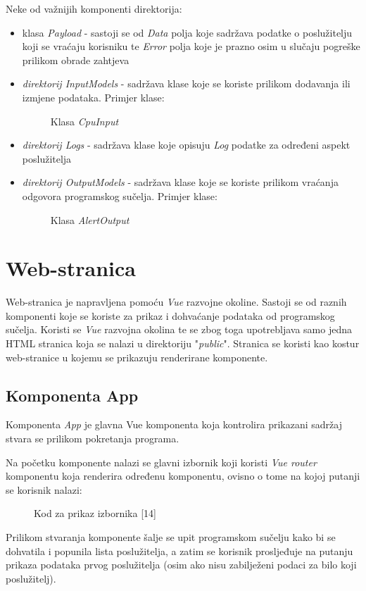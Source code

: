 \documentclass[zavrsnirad]{fer}
\begin{document}
Neke od važnijih komponenti direktorija:
\begin{itemize}
	\item klasa \textit{Payload} - sastoji se od \textit{Data} polja koje sadržava podatke o poslužitelju koji se vraćaju korisniku te \textit{Error} polja koje je prazno osim u slučaju pogreške prilikom obrade zahtjeva
	\item \textit{direktorij InputModels}  - sadržava klase koje se koriste prilikom dodavanja ili izmjene podataka. Primjer klase:
	\begin{figure}[htb]
		\centering
		
		\caption{Klasa \textit{CpuInput}}
	\end{figure}
	\FloatBarrier
	\item \textit{direktorij Logs} - sadržava klase koje opisuju \textit{Log} podatke za određeni aspekt poslužitelja
	\item \textit{direktorij OutputModels} - sadržava klase koje se koriste prilikom vraćanja odgovora programskog sučelja. Primjer klase:
	\begin{figure}[htb]
		\centering
		
		\caption{Klasa \textit{AlertOutput}}
	\end{figure}
	\FloatBarrier
\end{itemize}

\chapter{Web-stranica}
Web-stranica je napravljena pomoću \textit{Vue} razvojne okoline. Sastoji se od raznih komponenti koje se koriste za prikaz i dohvaćanje podataka od programskog sučelja.
Koristi se \textit{Vue} razvojna okolina te se zbog toga upotrebljava samo jedna HTML stranica koja se nalazi u direktoriju "\textit{public}". Stranica se koristi kao kostur web-stranice u kojemu se prikazuju renderirane komponente.

\section{Komponenta App}
Komponenta \textit{App} je glavna Vue komponenta koja kontrolira prikazani sadržaj stvara se prilikom pokretanja programa.

Na početku komponente nalazi se glavni izbornik koji koristi \textit{Vue router} komponentu koja renderira određenu komponentu, ovisno o tome na kojoj putanji se korisnik nalazi:
\begin{figure}[htb]
	\centering
	
	\caption{Kod za prikaz izbornika [14]}
\end{figure}
\FloatBarrier
Prilikom stvaranja komponente šalje se upit programskom sučelju kako bi se dohvatila i popunila lista poslužitelja, a zatim se korisnik prosljeđuje na putanju prikaza podataka prvog poslužitelja (osim ako nisu zabilježeni podaci za bilo koji poslužitelj).
\end{document}
